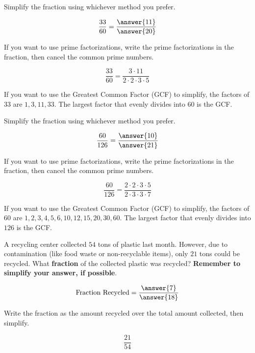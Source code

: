 \documentclass{ximera}[font=12pt]  %
\begin{document}
\begin{problem}
Simplify the fraction using whichever method you prefer.

\[ \frac{33}{60} = \frac{\answer{11}}{\answer{20}}\]

\begin{hint}
   If you want to use prime factorizations, write the prime factorizations in the fraction, then cancel the common prime numbers.

    \[ \frac{33}{60} = \frac{3 \cdot 11}{2 \cdot 2 \cdot 3 \cdot 5} \]

  \end{hint}

  \begin{hint}
    If you want to use the Greatest Common Factor (GCF) to simplify, the factors of $33$ are $1, 3, 11, 33.$  The largest factor
    that evenly divides into $60$ is the GCF.  
  \end{hint}

\end{problem}



\begin{problem}
  Simplify the fraction using whichever method you prefer.


  \[ \frac{60}{126} = \frac{\answer{10}}{\answer{21}} \]

  \begin{hint}
   If you want to use prime factorizations, write the prime factorizations in the fraction, then cancel the common prime numbers.

    \[ \frac{60}{126} = \frac{2 \cdot 2 \cdot 3 \cdot 5}{2 \cdot 3 \cdot 3 \cdot 7} \]

  \end{hint}

  \begin{hint}
    If you want to use the Greatest Common Factor (GCF) to simplify, the factors of $60$ are $1, 2, 3, 4, 5, 6, 10, 12, 15, 20, 30, 60.$  The
    largest factor that evenly divides into $126$ is the GCF. 
  \end{hint}

\end{problem}


\begin{problem}
  A recycling center collected $54$ tons of plastic last month.  However, due to contamination (like food waste or non-recyclable items), 
  only $21$ tons could be recycled.  What \textbf{fraction} of the collected plastic was recycled?  \textbf{Remember to simplify your answer, if possible}.

  \[ \text{Fraction Recycled} = \frac{\answer{7}}{\answer{18}} \]

  \begin{hint}
    Write the fraction as the amount recycled over the total amount collected, then simplify.

    \[ \frac{21}{54} \]
  \end{hint}

\end{problem}
\end{document}

